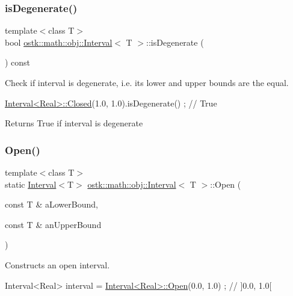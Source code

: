 \subsubsection{\texorpdfstring{is\+Degenerate()}{isDegenerate()}}
{\footnotesize\ttfamily template$<$class T$>$ \\
bool \hyperlink{classostk_1_1math_1_1obj_1_1_interval}{ostk\+::math\+::obj\+::\+Interval}$<$ T $>$\+::is\+Degenerate (\begin{DoxyParamCaption}{ }\end{DoxyParamCaption}) const}



Check if interval is degenerate, i.\+e. its lower and upper bounds are the equal. 


\begin{DoxyCode}
\hyperlink{classostk_1_1math_1_1obj_1_1_interval_a48e9f436e8994c49026a1ecd503bc190}{Interval<Real>::Closed}(1.0, 1.0).isDegenerate() ; \textcolor{comment}{// True}
\end{DoxyCode}


\begin{DoxyReturn}{Returns}
True if interval is degenerate 
\end{DoxyReturn}
\mbox{\label{classostk_1_1math_1_1obj_1_1_interval_ac80686dee5b2893e7b74a5120340db99}} 
\subsubsection{\texorpdfstring{Open()}{Open()}}
{\footnotesize\ttfamily template$<$class T$>$ \\
static \hyperlink{classostk_1_1math_1_1obj_1_1_interval}{Interval}$<$T$>$ \hyperlink{classostk_1_1math_1_1obj_1_1_interval}{ostk\+::math\+::obj\+::\+Interval}$<$ T $>$\+::Open (\begin{DoxyParamCaption}\item[{const T \&}]{a\+Lower\+Bound,  }\item[{const T \&}]{an\+Upper\+Bound }\end{DoxyParamCaption})\hspace{0.3cm}{\ttfamily [static]}}



Constructs an open interval. 


\begin{DoxyCode}
Interval<Real> interval = \hyperlink{classostk_1_1math_1_1obj_1_1_interval_ac80686dee5b2893e7b74a5120340db99}{Interval<Real>::Open}(0.0, 1.0) ; \textcolor{comment}{// ]0.0, 1.0[}
\end{DoxyCode}


